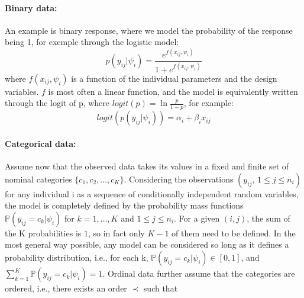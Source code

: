 \paragraph{Binary data:} An example is binary response, where we model the probability of the response being 1, for exemple through the logistic model:
$$ p(y_{ij} | \psi_i) = \dfrac{e^{f(x_{ij}, \psi_i)}}{1+e^{f(x_{ij}, \psi_i)}} $$
where $f(x_{ij}, \psi_i)$ is a function of the individual parameters and the design variables. $f$ is most often a linear function, and the model is equivalently written through the logit of p, where $logit(p) = \ln \frac{p}{1-p}$, for example:
$$ logit(p(y_{ij} | \psi_i)) = \alpha_i + \beta_i x_{ij} $$

% 

\paragraph{Categorical data:} Assume now that the observed data takes its values in a fixed and finite set of nominal categories $\{c_1, c_2,\ldots , c_K\}$. Considering the observations $(y_{ij},\, 1 \leq j \leq n_i)$ for any individual i as a sequence of conditionally independent random variables, the model is completely defined by the probability mass functions $\mathbb{P}(y_{ij}=c_k | \psi_i)$ for $k=1,\ldots, K$ and $1 \leq j \leq n_i$. For a given $(i,j)$, the sum of the K probabilities is $1$, so in fact only $K-1$ of them need to be defined. In the most general way possible, any model can be considered so long as it defines a probability distribution, i.e., for each k, $\mathbb{P}(y_{ij}=c_k | \psi_i) \in [0,1]$, and $\sum_{k=1}^{K} \mathbb{P}(y_{ij}=c_k | \psi_i) =1$. Ordinal data further assume that the categories are ordered, i.e., there exists an order $\prec$ such that

